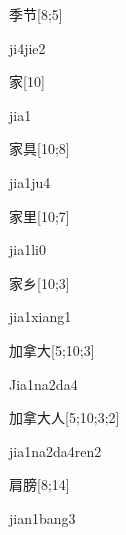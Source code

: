 \begin{verbete}[ji4jie2]{季节}[8;5]
\begin{pronuncia}{ji4jie2}
\end{pronuncia}
\end{verbete}

\begin{verbete}[jia1]{家}[10]
\begin{pronuncia}{jia1}
\end{pronuncia}
\end{verbete}

\begin{verbete}[jia1ju4]{家具}[10;8]
\begin{pronuncia}{jia1ju4}
\end{pronuncia}
\end{verbete}

\begin{verbete}[jia1li0]{家里}[10;7]
\begin{pronuncia}{jia1li0}
\end{pronuncia}
\end{verbete}

\begin{verbete}{家乡}[10;3]
\begin{pronuncia}{jia1xiang1}
\end{pronuncia}
\end{verbete}

\begin{verbete}[Jia1na2da4]{加拿大}[5;10;3]
\begin{pronuncia}{Jia1na2da4}
\end{pronuncia}
\end{verbete}

\begin{verbete}{加拿大人}[5;10;3;2]
\begin{pronuncia}[\\]{jia1na2da4ren2}
\end{pronuncia}
\end{verbete}

\begin{verbete}{肩膀}[8;14]
\begin{pronuncia}{jian1bang3}
\end{pronuncia}
\end{verbete}

